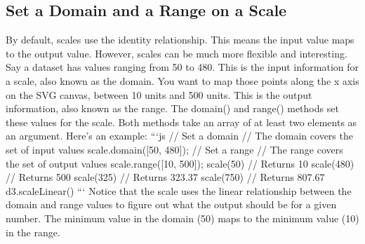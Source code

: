 \documentclass{article}%
\begin{document}
%
\subsection{Set a Domain and a Range on a Scale}%
\label{subsec:SetaDomainandaRangeonaScale}%
By default, scales use the identity relationship. This means the input value maps to the output value. However, scales can be much more flexible and interesting.\newline%
Say a dataset has values ranging from 50 to 480. This is the input information for a scale, also known as the domain.\newline%
You want to map those points along the x axis on the SVG canvas, between 10 units and 500 units. This is the output information, also known as the range.\newline%
The domain() and range() methods set these values for the scale. Both methods take an array of at least two elements as an argument. Here's an example:\newline%
```js\newline%
// Set a domain\newline%
// The domain covers the set of input values\newline%
scale.domain({[}50, 480{]});\newline%
// Set a range\newline%
// The range covers the set of output values\newline%
scale.range({[}10, 500{]});\newline%
scale(50) // Returns 10\newline%
scale(480) // Returns 500\newline%
scale(325) // Returns 323.37\newline%
scale(750) // Returns 807.67\newline%
d3.scaleLinear()\newline%
```\newline%
Notice that the scale uses the linear relationship between the domain and range values to figure out what the output should be for a given number. The minimum value in the domain (50) maps to the minimum value (10) in the range.\newline%

%
\end{document}

